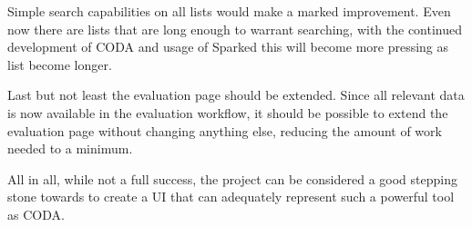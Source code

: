 Simple search capabilities on all lists would make a marked improvement. Even now there are lists that are long enough to warrant searching, with the continued development of CODA and usage of Sparked this will become more pressing as list become longer.

Last but not least the evaluation page should be extended. Since all relevant data is now available in the evaluation workflow, it should be possible to extend the evaluation page without changing anything else, reducing the amount of work needed to a minimum. 

All in all, while not a full success, the project can be considered a good stepping stone towards to create a UI that can adequately represent such a powerful tool as CODA.